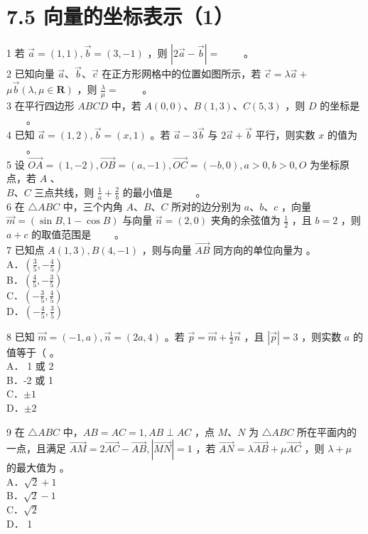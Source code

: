 \documentclass[10pt]{article}
\begin{document}
\section*{7.5 向量的坐标表示（1）}
1 若 \(\vec{a}=(1,1), \vec{b}=(3,-1)\) ，则 \(|2 \vec{a}-\vec{b}|=\) \(\qquad\)。\\
2 已知向量 \(\vec{a} 、 \vec{b} 、 \vec{c}\) 在正方形网格中的位置如图所示，若 \(\vec{c}=\lambda \vec{a}+\) \(\mu \vec{b}(\lambda, \mu \in \mathbf{R})\) ，则 \(\frac{\lambda}{\mu}=\) \(\qquad\)。\\
3 在平行四边形 \(A B C D\) 中，若 \(A(0,0) 、 B(1,3) 、 C(5,3)\) ，则 \(D\) 的坐标是 \(\qquad\)。\\
4 已知 \(\vec{a}=(1,2), \vec{b}=(x, 1)\) 。若 \(\vec{a}-3 \vec{b}\) 与 \(2 \vec{a}+\vec{b}\) 平行，则实数 \(x\) 的值为 \(\qquad\)。\\
5 设 \(\overrightarrow{O A}=(1,-2), \overrightarrow{O B}=(a,-1), \overrightarrow{O C}=(-b, 0), a>0, b>0, O\) 为坐标原点，若 \(A\) 、\\
\(B 、 C\) 三点共线，则 \(\frac{1}{a}+\frac{2}{b}\) 的最小值是 \(\qquad\)。\\
6 在 \(\triangle A B C\) 中，三个内角 \(A 、 B 、 C\) 所对的边分别为 \(a 、 b 、 c\) ，向量 \(\vec{m}=(\sin B, 1-\cos B)\) 与向量 \(\vec{n}=(2,0)\) 夹角的余弦值为 \(\frac{1}{2}\) ，且 \(b=2\) ，则 \(a+c\) 的取值范围是 \(\qquad\)。\\
7 已知点 \(A(1,3), B(4,-1)\) ，则与向量 \(\overrightarrow{A B}\) 同方向的单位向量为 。\\
A．\(\left(\frac{3}{5},-\frac{4}{5}\right)\)\\
B．\(\left(\frac{4}{5},-\frac{3}{5}\right)\)\\
C．\(\left(-\frac{3}{5}, \frac{4}{5}\right)\)\\
D．\(\left(-\frac{4}{5}, \frac{3}{5}\right)\)

8 已知 \(\vec{m}=(-1, a), \vec{n}=(2 a, 4)\) 。若 \(\vec{p}=\vec{m}+\frac{1}{2} \vec{n}\) ，且 \(|\vec{p}|=3\) ，则实数 \(a\) 的值等于（ 。\\
A． 1 或 2\\
B．-2 或 1\\
C．\(\pm 1\)\\
D．\(\pm 2\)

9 在 \(\triangle A B C\) 中，\(A B=A C=1, A B \perp A C\) ，点 \(M 、 N\) 为 \(\triangle A B C\) 所在平面内的一点，且满足 \(\overrightarrow{A M}=2 \overrightarrow{A C}-\overrightarrow{A B},|\overrightarrow{M N}|=1\) ，若 \(\overrightarrow{A N}=\lambda \overrightarrow{A B}+\mu \overrightarrow{A C}\) ，则 \(\lambda+\mu\) 的最大值为 。\\
A．\(\sqrt{2}+1\)\\
B．\(\sqrt{2}-1\)\\
C．\(\sqrt{2}\)\\
D． 1
\end{document}
